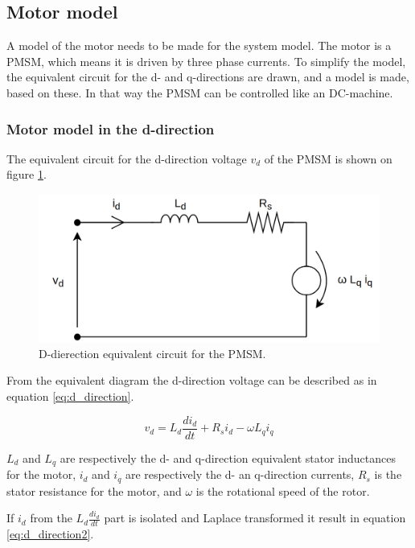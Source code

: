 \subsection{Motor model}
A model of the motor needs to be made for the system model. The motor is a PMSM,  which means it is driven by three phase currents. To simplify the model, the equivalent circuit for the d- and q-directions are drawn, and a model is made, based on these. In that way the PMSM can be controlled like an DC-machine.

\subsubsection{Motor model in the d-direction}
The equivalent circuit for the d-direction voltage $v_d$ of the PMSM is shown on figure \ref{fig:vd}.

\begin{figure}[H]
	\centering
	\includegraphics[width=0.6\linewidth]{pictures/control/vd}
	\caption{D-dierection equivalent circuit for the PMSM.}
	\label{fig:vd}
\end{figure}


From the equivalent diagram the d-direction voltage can be described as in equation \ref{eq:d_direction}.

\begin{equation}
    \label{eq:d_direction}
    v_d = L_d \frac{d i_d}{dt} + R_s i_d - \omega L_q i_q
\end{equation}

$L_d$ and $L_q$ are respectively the d- and q-direction equivalent stator inductances for the motor, $i_d$ and $i_q$ are respectively the d- an q-direction currents, $R_s$ is the stator resistance for the motor, and $\omega$ is the rotational speed of the rotor.

If $i_d$ from the $L_d \frac{di_d}{dt}$ part is isolated and Laplace transformed it result in equation \ref{eq:d_direction2}.

